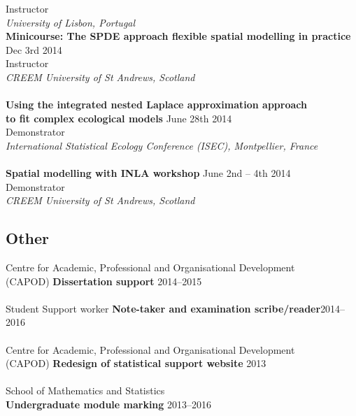 \documentclass[10pt,letter]{article}
\begin{document}
 Instructor\\
 {\sl University of Lisbon, Portugal}\\
 \newpage
 \noindent
  {\textbf{{Minicourse: The SPDE approach flexible spatial modelling in practice}}} \hfill Dec 3rd  2014\\
 Instructor\\
 {\sl CREEM University of St Andrews, Scotland}\\ 
 \hdashrule[0.5ex]{4cm}{1pt}{1pt}\\
\noindent
    \textbf {Using the integrated nested Laplace approximation approach} \\
    \textbf{to fit complex ecological models}  \hfill June 28th 2014\\
 Demonstrator\\
 {\sl International Statistical Ecology Conference (ISEC), Montpellier, France}\\
 \hdashrule[0.5ex]{4cm}{1pt}{1pt}\\
{\textbf{{Spatial modelling with INLA workshop}}} \hfill June 2nd – 4th  2014\\
 Demonstrator\\
 {\sl CREEM University of St Andrews, Scotland}\\ 

  \vspace{1mm}
 \subsection*{Other}
 \vspace{1mm}

 
 Centre for Academic, Professional and Organisational Development\\ (CAPOD) \textbf{Dissertation support} \hfill{2014--2015}\\
 \hdashrule[0.5ex]{4cm}{1pt}{1pt}\\
Student Support worker \textbf{Note-taker and examination scribe/reader}\hfill {2014--2016}\\
\hdashrule[0.5ex]{4cm}{1pt}{1pt}\\
 Centre for Academic, Professional and Organisational Development\\ (CAPOD) \textbf{Redesign of statistical support website} \hfill{2013}\\
 \hdashrule[0.5ex]{4cm}{1pt}{1pt}\\
School of Mathematics and Statistics\\ \textbf{Undergraduate module marking} \hfill{2013--2016}\\
 
\end{document}
